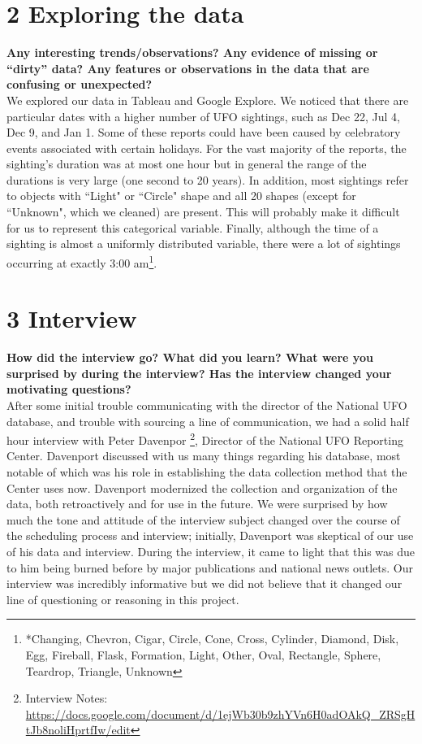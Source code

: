 \documentclass{neu_handout}
\begin{document}
\section*{2 Exploring the data}

\textbf{Any interesting
trends/observations? Any evidence of missing or “dirty” data? Any features or
observations in the data that are confusing or unexpected?}\\

We explored our data in Tableau and Google Explore. We noticed that there are particular dates with a higher number of UFO sightings, such as Dec 22, Jul 4, Dec 9, and Jan 1. Some of these reports could have been caused by celebratory events associated with certain holidays. For the vast majority of the reports, the sighting's duration was at most one hour but in general the range of the durations is very large (one second to 20 years). In addition, most sightings refer to objects with ``Light" or ``Circle" shape and all 20 shapes (except for ``Unknown", which we cleaned) are present. This will probably make it difficult for us to represent this categorical variable. Finally, although the time of a sighting is almost a uniformly distributed variable, there were a lot of sightings occurring at exactly 3:00 am\footnote{*Changing, Chevron, Cigar, Circle, Cone, Cross, Cylinder, Diamond, Disk, Egg, Fireball, Flask, Formation, Light, Other, Oval, Rectangle, Sphere, Teardrop, Triangle, Unknown}.\\




\section*{3 Interview}

\textbf{How did the interview go? What did you learn? What were you surprised by during the interview? Has the interview changed your motivating questions?}\\ 

After some initial trouble communicating with the director of the National UFO database, and trouble with sourcing a line of communication, we had a solid half hour interview with Peter Davenpor \footnote{Interview Notes: \url{https://docs.google.com/document/d/1ejWb30b9zhYVn6H0adOAkQ_ZRSgHtJb8noliHprtfIw/edit}}, Director of the National UFO Reporting Center. Davenport discussed with us many things regarding his database, most notable of which was his role in establishing the data collection method that the Center uses now. Davenport modernized the collection and organization of the data, both retroactively and for use in the future. We were surprised by how much the tone and attitude of the interview subject changed over the course of the scheduling process and interview; initially, Davenport was skeptical of our use of his data and interview. During the interview, it came to light that this was due to him being burned before by major publications and national news outlets. Our interview was incredibly informative but we did not believe that it changed our line of questioning or reasoning in this project.\\
\end{document}
